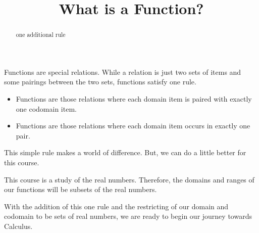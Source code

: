 \documentclass{ximera}
\title{What is a Function?}
\begin{document}
\begin{abstract}
one additional rule
\end{abstract}
\maketitle




Functions are special relations. While a relation is just two sets of items and some pairings between the two sets, functions satisfy one rule. 

\begin{itemize}
\item Functions are those relations where each domain item is paired with exactly one codomain item.
\item Functions are those relations where each domain item occurs in exactly one pair.
\end{itemize}


This simple rule makes a world of difference. But, we can do a little better for this course.

This course is a study of the real numbers.  Therefore, the domains and ranges of our functions will be subsets of the real numbers.


With the addition of this one rule and the restricting of our domain and codomain to be sets of real numbers, we are ready to begin our journey towards Calculus.
\end{document}
